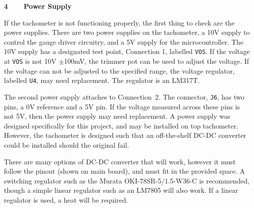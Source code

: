 \documentclass[11pt]{article}
\begin{document}
{\large\textbf{4~~~~Power Supply}}

If the tachometer is not functioning properly, the first thing to check are the power supplies. There are two power supplies on the tachometer, a 10V supply to control the gauge driver circuitry, and a 5V supply for the microcontroller. The 10V supply has a designated test point, Connection 1, labelled \verb|VOS|. If the voltage at \verb|VOS| is not 10V $\pm$100mV, the  trimmer pot can be used to adjust the voltage. If the voltage can not be adjusted to the specified range, the voltage regulator, labelled \verb|U4|, may need replacement. The regulator is an LM317T.

The second power supply attaches to Connection~2. The connector, \verb|J6|, has two pins, a 0V reference and a  5V pin. If the voltage measured across these pins is not 5V, then the power supply may need replacement. A power supply was designed specifically for this project, and may be installed on top tachometer. However, the tachometer is designed such that an off-the-shelf DC-DC converter could be installed should the original fail.

There are many options of DC-DC converter that will work, however it must follow the pinout (shown on main board), and must fit in the provided space. A switching regulator such as the Murata OKI-78SR-5/1.5-W36-C is recommended, though a simple linear regulator such as an LM7805 will also work. If a linear regulator is used, a heat will be required.
\end{document}
